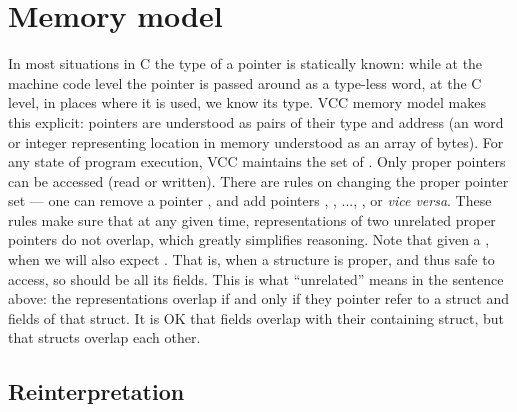 \section{Memory model}
\label{sect:memmodel}

In most situations in C the type of a pointer is statically known:
while at the machine code level the pointer is passed around as a type-less
word, at the C level, in places where it is used, we know its type.
VCC memory model makes this explicit: pointers are understood as pairs
of their type and address (an word or integer representing location in memory
understood as an array of bytes).
For any state of program execution, VCC maintains the set of .
Only proper pointers can be accessed (read or written).
There are rules on changing the proper pointer set --- \eg one can remove
a pointer , and add pointers , ,
..., , or \emph{vice versa}.
These rules make sure that at any given time, representations of two
unrelated proper pointers do not overlap, which greatly simplifies reasoning.
Note that given a , when 
we will also expect .
That is, when a structure is proper, and thus safe to access, so should
be all its fields.
This is what ``unrelated'' means in the sentence above:
the representations overlap if and only if they pointer refer to a struct
and fields of that struct.
It is OK that fields overlap with their containing struct, but that
structs overlap each other.

\subsection{Reinterpretation}
\label{sect:reint}
